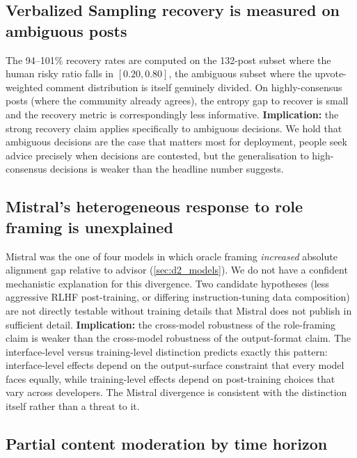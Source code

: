\subsection{Verbalized Sampling recovery is measured on ambiguous posts}
\label{sec:disc_lim_ambiguous}

The 94--101\% recovery rates are computed on the 132-post subset
where the human risky ratio falls in $[0.20, 0.80]$, the ambiguous
subset where the upvote-weighted comment distribution is itself
genuinely divided. On highly-consensus posts (where the community
already agrees), the entropy gap to recover is small and the recovery
metric is correspondingly less informative.
\textbf{Implication:} the strong recovery claim applies specifically
to ambiguous decisions. We hold that ambiguous decisions are the case
that matters most for deployment, people seek advice precisely when
decisions are contested, but the generalisation to high-consensus
decisions is weaker than the headline number suggests.

\subsection{Mistral's heterogeneous response to role framing is unexplained}
\label{sec:disc_lim_mistral}

Mistral was the one of four models in which oracle framing
\emph{increased} absolute alignment gap relative to advisor
(\cref{sec:d2_models}). We do not have a confident mechanistic
explanation for this divergence. Two candidate hypotheses (less
aggressive RLHF post-training, or differing instruction-tuning data
composition) are not directly testable without training details
that Mistral does not publish in sufficient detail.
\textbf{Implication:} the cross-model robustness of the role-framing
claim is weaker than the cross-model robustness of the output-format
claim. The interface-level versus training-level distinction
predicts exactly this pattern: interface-level effects depend on the
output-surface constraint that every model faces equally, while
training-level effects depend on post-training choices that vary
across developers. The Mistral divergence is consistent with the
distinction itself rather than a threat to it.

\subsection{Partial content moderation by time horizon}
\label{sec:disc_lim_time_horizon}

